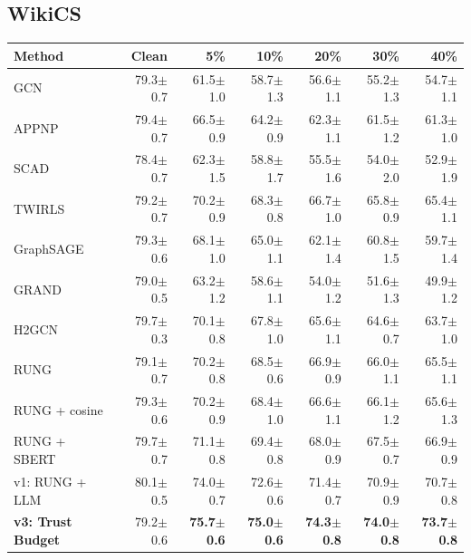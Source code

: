 \documentclass{article}
\newcommand{\score}[2]{#1{\scriptsize$\pm$#2}}
\begin{document}
\subsection{WikiCS}
\begin{center}
\scriptsize
\begin{tabular}{lrrrrrr}
\toprule
Method & Clean & 5\% & 10\% & 20\% & 30\% & 40\% \\
\midrule
GCN & \score{79.3}{0.7} & \score{61.5}{1.0} & \score{58.7}{1.3} & \score{56.6}{1.1} & \score{55.2}{1.3} & \score{54.7}{1.1} \\
APPNP & \score{79.4}{0.7} & \score{66.5}{0.9} & \score{64.2}{0.9} & \score{62.3}{1.1} & \score{61.5}{1.2} & \score{61.3}{1.0} \\
SCAD & \score{78.4}{0.7} & \score{62.3}{1.5} & \score{58.8}{1.7} & \score{55.5}{1.6} & \score{54.0}{2.0} & \score{52.9}{1.9} \\
TWIRLS & \score{79.2}{0.7} & \score{70.2}{0.9} & \score{68.3}{0.8} & \score{66.7}{1.0} & \score{65.8}{0.9} & \score{65.4}{1.1} \\
GraphSAGE & \score{79.3}{0.6} & \score{68.1}{1.0} & \score{65.0}{1.1} & \score{62.1}{1.4} & \score{60.8}{1.5} & \score{59.7}{1.4} \\
GRAND & \score{79.0}{0.5} & \score{63.2}{1.2} & \score{58.6}{1.1} & \score{54.0}{1.2} & \score{51.6}{1.3} & \score{49.9}{1.2} \\
H2GCN & \score{79.7}{0.3} & \score{70.1}{0.8} & \score{67.8}{1.0} & \score{65.6}{1.1} & \score{64.6}{0.7} & \score{63.7}{1.0} \\
RUNG & \score{79.1}{0.7} & \score{70.2}{0.8} & \score{68.5}{0.6} & \score{66.9}{0.9} & \score{66.0}{1.1} & \score{65.5}{1.1} \\
RUNG + cosine & \score{79.3}{0.6} & \score{70.2}{0.9} & \score{68.4}{1.0} & \score{66.6}{1.1} & \score{66.1}{1.2} & \score{65.6}{1.3} \\
RUNG + SBERT & \score{79.7}{0.7} & \score{71.1}{0.8} & \score{69.4}{0.8} & \score{68.0}{0.9} & \score{67.5}{0.7} & \score{66.9}{0.9} \\
v1: RUNG + LLM & \score{80.1}{0.5} & \score{74.0}{0.7} & \score{72.6}{0.6} & \score{71.4}{0.7} & \score{70.9}{0.9} & \score{70.7}{0.8} \\
\textbf{v3: Trust Budget} & \score{79.2}{0.6} & \textbf{\score{75.7}{0.6}} & \textbf{\score{75.0}{0.6}} & \textbf{\score{74.3}{0.8}} & \textbf{\score{74.0}{0.8}} & \textbf{\score{73.7}{0.8}} \\
\bottomrule
\end{tabular}
\end{center}
\end{document}

